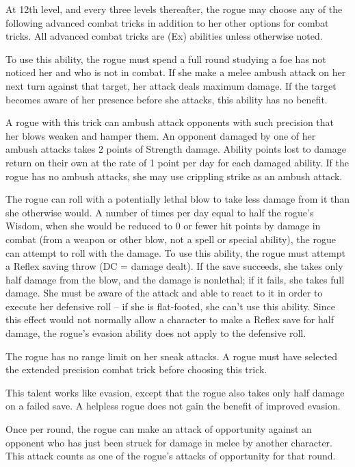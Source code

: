  At 12th level, and every three levels thereafter, the rogue may choose any of the following advanced combat tricks in addition to her other options for combat tricks. All advanced combat tricks are (Ex) abilities unless otherwise noted.

 To use this ability, the rogue must spend a full round studying a foe has not noticed her and who is not in combat. If she make a melee ambush attack on her next turn against that target, her attack deals maximum damage. If the target becomes aware of her presence before she attacks, this ability has no benefit.

 A rogue with this trick can ambush attack opponents with such precision that her blows weaken and hamper them. An opponent damaged by one of her ambush attacks takes 2 points of Strength damage. Ability points lost to damage return on their own at the rate of 1 point per day for each damaged ability. If the rogue has no ambush attacks, she may use crippling strike as an ambush attack.

  The rogue can roll with a potentially lethal blow to take less damage from it than she otherwise would.  A number of times per day equal to half the rogue's Wisdom, when she would be reduced to 0 or fewer hit points by damage in combat (from a weapon or other blow, not a spell or special ability), the rogue can attempt to roll with the damage. To use this ability, the rogue must attempt a Reflex saving throw (DC = damage dealt). If the save succeeds, she takes only half damage from the blow, and the damage is nonlethal; if it fails, she takes full damage. She must be aware of the attack and able to react to it in order to execute her defensive roll -- if she is flat-footed, she can't use this ability. Since this effect would not normally allow a character to make a Reflex save for half damage, the rogue's evasion ability does not apply to the defensive roll.

 The rogue has no range limit on her sneak attacks. A rogue must have selected the extended precision combat trick before choosing this trick.

 This talent works like evasion, except that the rogue also takes only half damage on a failed save. A helpless rogue does not gain the benefit of improved evasion.

  Once per round, the rogue can make an attack of opportunity against an opponent who has just been struck for damage in melee by another character. This attack counts as one of the rogue's attacks of opportunity for that round.

